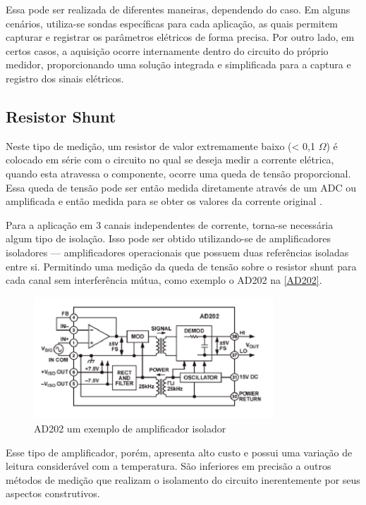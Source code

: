 Essa pode ser realizada de diferentes maneiras, dependendo do caso. Em alguns cenários, utiliza-se sondas específicas para cada aplicação, as quais permitem capturar e registrar os parâmetros elétricos de forma precisa. Por outro lado, em certos casos, a aquisição ocorre internamente dentro do circuito do próprio medidor, proporcionando uma solução integrada e simplificada para a captura e registro dos sinais elétricos.

\subsection{Resistor Shunt}\label{subsec:resiShunt}
Neste tipo de medição, um resistor de valor extremamente baixo (< 0,1 $\Omega$) é colocado em série com o circuito no qual se deseja medir a corrente elétrica, quando esta atravessa o componente, ocorre uma queda de tensão proporcional. Essa queda de tensão pode ser então medida diretamente através de um \gls{ADC} ou amplificada e então medida para se obter os valores da corrente original \citep{curr_sens_tech}.

Para a aplicação em 3 canais independentes de corrente, torna-se necessária algum tipo de isolação. Isso pode ser obtido utilizando-se de amplificadores isoladores --- amplificadores operacionais que possuem duas referências isoladas entre si. Permitindo uma medição da queda de tensão sobre o resistor shunt para cada canal sem interferência mútua, como exemplo o AD202 na \autoref{AD202}.

\begin{figure}[htb!]
    \caption{AD202 um exemplo de amplificador isolador}
    \label{AD202}
    \includegraphics[width=0.8\textwidth]{figuras/AD202-ampop-isolado.png}
\end{figure}

Esse tipo de amplificador, porém, apresenta alto custo e possui uma variação de leitura considerável com a temperatura. São inferiores em precisão a outros métodos de medição que realizam o isolamento do circuito inerentemente por seus aspectos construtivos.

